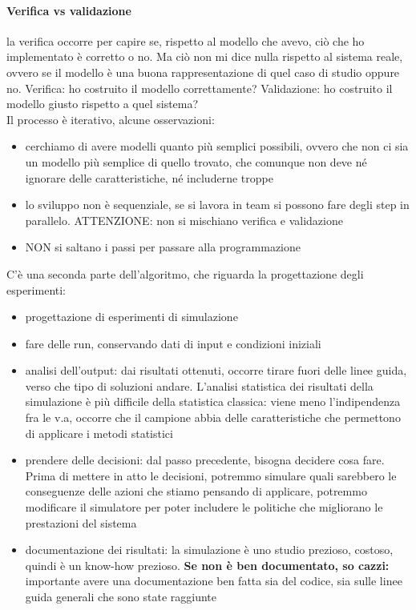 \documentclass{article}
\begin{document}
\paragraph{Verifica vs validazione} la verifica occorre per capire se, rispetto al modello che avevo, ciò che ho implementato è corretto o no. Ma ciò non mi dice nulla rispetto al sistema reale, ovvero se il modello è una buona rappresentazione di quel caso di studio oppure no. Verifica: ho costruito il modello correttamente? Validazione: ho costruito il modello giusto rispetto a quel sistema?\\ Il processo è iterativo, alcune osservazioni:
\begin{itemize}
\item cerchiamo di avere modelli quanto più semplici possibili, ovvero che non ci sia un modello più semplice di quello trovato, che comunque non deve né ignorare delle caratteristiche, né includerne troppe
\item lo sviluppo non è sequenziale, se si lavora in team si possono fare degli step in parallelo. ATTENZIONE: non si mischiano verifica e validazione
\item NON si saltano i passi per passare alla programmazione
\end{itemize}
C'è una seconda parte dell'algoritmo, che riguarda la progettazione degli esperimenti:
\begin{itemize}
\item progettazione di esperimenti di simulazione
\item fare delle run, conservando dati di input e condizioni iniziali
\item analisi dell'output: dai risultati ottenuti, occorre tirare fuori delle linee guida, verso che tipo di soluzioni andare. L'analisi statistica dei risultati della simulazione è più difficile della statistica classica: viene meno l'indipendenza fra le v.a, occorre che il campione abbia delle caratteristiche che permettono di applicare i metodi statistici
\item prendere delle decisioni: dal passo precedente, bisogna decidere cosa fare. Prima di mettere in atto le decisioni, potremmo simulare quali sarebbero le conseguenze delle azioni che stiamo pensando di applicare, potremmo modificare il simulatore per poter includere le politiche che migliorano le prestazioni del sistema
\item documentazione dei risultati: la simulazione è uno studio prezioso, costoso, quindi è un know-how prezioso. \textbf{Se non è ben documentato, so cazzi:} importante avere una documentazione ben fatta sia del codice, sia sulle linee guida generali che sono state raggiunte
\end{itemize}
\end{document}
